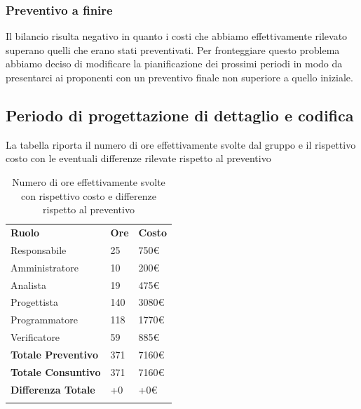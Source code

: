 		\subsubsection{Preventivo a finire}
		Il bilancio risulta negativo in quanto i costi che abbiamo effettivamente rilevato superano quelli che erano stati preventivati. Per fronteggiare questo problema abbiamo deciso di modificare la pianificazione dei prossimi periodi in modo da presentarci ai proponenti con un preventivo finale non superiore a quello iniziale.




		
\pagebreak
\subsection{Periodo di progettazione di dettaglio e codifica}
La tabella riporta il numero di ore effettivamente svolte dal gruppo e il rispettivo costo con le eventuali differenze rilevate rispetto al preventivo
\begin{longtable} {							
		>{}p{40mm}  
		>{}p{20mm}	
		>{}p{28mm}			
	}			
	\rowcolor{gray!50}
	
	\textbf{Ruolo}            & \textbf{Ore} & \textbf{Costo}       \TBstrut \\
	Responsabile              & 25           & 750\euro             \TBstrut \\
	Amministratore            & 10           & 200\euro             \TBstrut \\
	Analista                  & 19           & 475\euro             \TBstrut \\
	Progettista               & 140          & 3080\euro            \TBstrut \\
	Programmatore             & 118          & 1770\euro            \TBstrut \\
	Verificatore              & 59           & 885\euro             \TBstrut \\
	\textbf{Totale Preventivo}& 371          & 7160\euro            \TBstrut \\	
	\textbf{Totale Consuntivo}& 371          & 7160\euro            \TBstrut \\	
	\textbf{Differenza Totale}& +0           & +0\euro              \TBstrut \\
	\rowcolor{white}
	\caption{Numero di ore effettivamente svolte con rispettivo costo e differenze rispetto al preventivo}	
\end{longtable}

